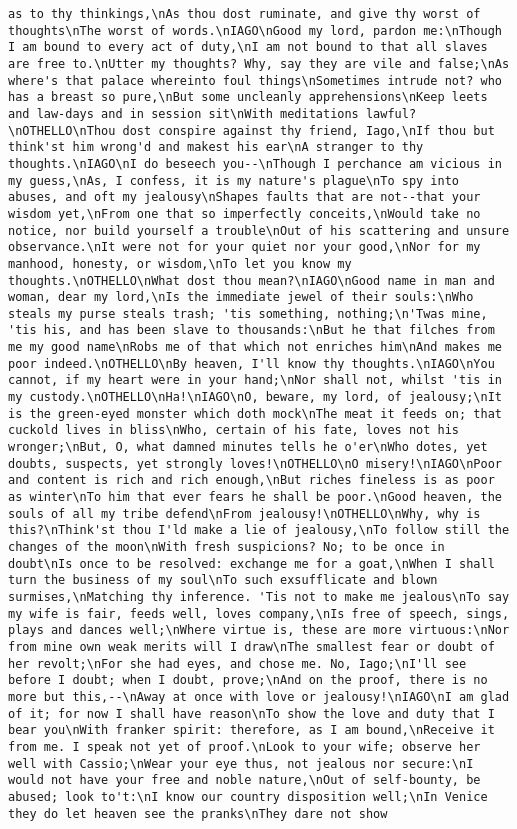 \begin{verbatim}
as to thy thinkings,\nAs thou dost ruminate, and give thy worst of thoughts\nThe worst of words.\nIAGO\nGood my lord, pardon me:\nThough I am bound to every act of duty,\nI am not bound to that all slaves are free to.\nUtter my thoughts? Why, say they are vile and false;\nAs where's that palace whereinto foul things\nSometimes intrude not? who has a breast so pure,\nBut some uncleanly apprehensions\nKeep leets and law-days and in session sit\nWith meditations lawful?\nOTHELLO\nThou dost conspire against thy friend, Iago,\nIf thou but think'st him wrong'd and makest his ear\nA stranger to thy thoughts.\nIAGO\nI do beseech you--\nThough I perchance am vicious in my guess,\nAs, I confess, it is my nature's plague\nTo spy into abuses, and oft my jealousy\nShapes faults that are not--that your wisdom yet,\nFrom one that so imperfectly conceits,\nWould take no notice, nor build yourself a trouble\nOut of his scattering and unsure observance.\nIt were not for your quiet nor your good,\nNor for my manhood, honesty, or wisdom,\nTo let you know my thoughts.\nOTHELLO\nWhat dost thou mean?\nIAGO\nGood name in man and woman, dear my lord,\nIs the immediate jewel of their souls:\nWho steals my purse steals trash; 'tis something, nothing;\n'Twas mine, 'tis his, and has been slave to thousands:\nBut he that filches from me my good name\nRobs me of that which not enriches him\nAnd makes me poor indeed.\nOTHELLO\nBy heaven, I'll know thy thoughts.\nIAGO\nYou cannot, if my heart were in your hand;\nNor shall not, whilst 'tis in my custody.\nOTHELLO\nHa!\nIAGO\nO, beware, my lord, of jealousy;\nIt is the green-eyed monster which doth mock\nThe meat it feeds on; that cuckold lives in bliss\nWho, certain of his fate, loves not his wronger;\nBut, O, what damned minutes tells he o'er\nWho dotes, yet doubts, suspects, yet strongly loves!\nOTHELLO\nO misery!\nIAGO\nPoor and content is rich and rich enough,\nBut riches fineless is as poor as winter\nTo him that ever fears he shall be poor.\nGood heaven, the souls of all my tribe defend\nFrom jealousy!\nOTHELLO\nWhy, why is this?\nThink'st thou I'ld make a lie of jealousy,\nTo follow still the changes of the moon\nWith fresh suspicions? No; to be once in doubt\nIs once to be resolved: exchange me for a goat,\nWhen I shall turn the business of my soul\nTo such exsufflicate and blown surmises,\nMatching thy inference. 'Tis not to make me jealous\nTo say my wife is fair, feeds well, loves company,\nIs free of speech, sings, plays and dances well;\nWhere virtue is, these are more virtuous:\nNor from mine own weak merits will I draw\nThe smallest fear or doubt of her revolt;\nFor she had eyes, and chose me. No, Iago;\nI'll see before I doubt; when I doubt, prove;\nAnd on the proof, there is no more but this,--\nAway at once with love or jealousy!\nIAGO\nI am glad of it; for now I shall have reason\nTo show the love and duty that I bear you\nWith franker spirit: therefore, as I am bound,\nReceive it from me. I speak not yet of proof.\nLook to your wife; observe her well with Cassio;\nWear your eye thus, not jealous nor secure:\nI would not have your free and noble nature,\nOut of self-bounty, be abused; look to't:\nI know our country disposition well;\nIn Venice they do let heaven see the pranks\nThey dare not show 
\end{verbatim}
